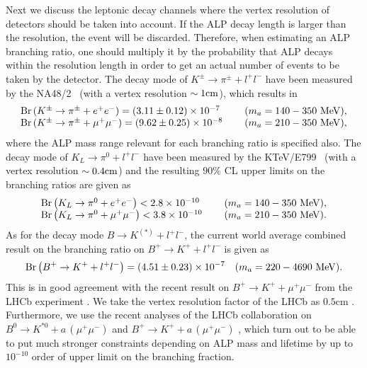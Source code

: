 \documentclass[preprint,prd,aps,tighten,nofootinbib,amssymb]{revtex4}
\newcommand{\bea}{\begin{eqnarray}}
\newcommand{\eea}{\end{eqnarray}}
\begin{document}
Next we discuss the leptonic decay channels where
the vertex resolution of detectors should be taken into account. If the ALP decay length is larger than the resolution, the event will be discarded. 
Therefore, when estimating an ALP branching ratio, one should multiply it by the probability that ALP decays within the resolution length in order to get an actual number of events to 
be taken by the detector.   
The decay mode of $K^{\pm} \rightarrow \pi^{\pm} + l^+l^-$ have been measured by the NA48/2~\cite{Batley:2009aa,Batley:2011zz} (with a vertex resolution  $\sim 1 {\rm cm}$), which results in
\bea
\left.
\begin{tabular}{ll}
${\rm Br}\left(K^{\pm} \rightarrow \pi^{\pm} + e^+e^- \right) = \left(3.11\pm0.12\right)  \times 10^{-7}  $ & $\quad (m_a=140-350~{\rm MeV}),$ \\
${\rm Br}\left(K^{\pm} \rightarrow \pi^{\pm} + \mu^+\mu^- \right) = \left(9.62\pm0.25\right)  \times 10^{-8}  $ & $\quad (m_a=210-350~{\rm MeV}),$
\end{tabular} 
\right.
\eea
where the ALP mass range relevant for each branching ratio is specified also.
The decay mode of $K_L \rightarrow \pi^0 + l^+l^-$ have been measured by the KTeV/E799~\cite{AlaviHarati:2000hs,AlaviHarati:2003mr} (with a vertex resolution  $\sim 0.4 {\rm cm}$) and the resulting $90\%$ CL upper limits on the branching ratios are  given as
\bea
\left.
\begin{tabular}{ll}
${\rm Br}\left(K_L \rightarrow \pi^0 + e^+e^- \right) < 2.8  \times 10^{-10}  $ & $\quad (m_a=140-350~{\rm MeV}),$ \\
${\rm Br}\left(K_L \rightarrow \pi^0 + \mu^+\mu^- \right) < 3.8  \times 10^{-10}  $ & $\quad (m_a=210-350~{\rm MeV}).$
\end{tabular} 
\right.
\eea
As for the decay mode $B \rightarrow K^{(*)} + l^+l^-$,  
the current world average combined result on the branching ratio on $B^+ \rightarrow K^+ +l^+ l^-$ is given as \cite{Olive:2016xmw}
\bea
{\rm Br}\left(B^+ \rightarrow K^+ + l^+l^- \right) = \left(4.51\pm 0.23\right)  \times 10^{-7}  \quad (m_a=220-4690~{\rm MeV}) .
\eea
This is in good agreement with the recent result on $B^+ \rightarrow K^+ +\mu^+ \mu^-$ from the LHCb experiment \cite{Aaij:2016cbx}.
We take the vertex resolution factor of the LHCb as $0.5$cm \cite{Dolan:2014ska}. Furthermore,
we use the recent analyses of the LHCb collaboration on  
 $B^0 \rightarrow K^{*0} + a\,(\mu^+ \mu^-) $ \cite{Aaij:2015tna} and $B^+ \rightarrow K^+ +a\,(\mu^+ \mu^-)$ \cite{Aaij:2016qsm}, which turn out to be able to put much stronger constraints depending on ALP mass and lifetime by up to $10^{-10}$ order of upper limit on the branching fraction. 
\end{document}
